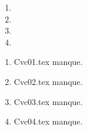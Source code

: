  
 
\begin{enumerate}
  \item  
  \item  
  \item  
  \item  
\end{enumerate} 
\clearpage 
{}
\begin{enumerate}
  \item Cvc01.tex manque. 
  \item Cvc02.tex manque. 
  \item Cvc03.tex manque. 
  \item Cvc04.tex manque. 
\end{enumerate} 
